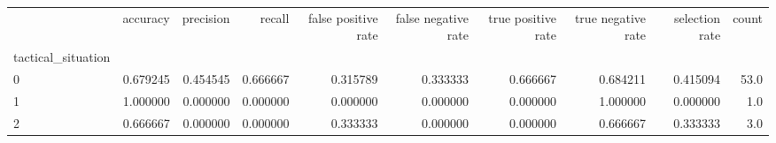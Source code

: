 \begin{tabular}{lrrrrrrrrr}
\toprule
{} &  accuracy &  precision &    recall &  false positive rate &  false negative rate &  true positive rate &  true negative rate &  selection rate &  count \\
tactical\_situation &           &            &           &                      &                      &                     &                     &                 &        \\
\midrule
0                  &  0.679245 &   0.454545 &  0.666667 &             0.315789 &             0.333333 &            0.666667 &            0.684211 &        0.415094 &   53.0 \\
1                  &  1.000000 &   0.000000 &  0.000000 &             0.000000 &             0.000000 &            0.000000 &            1.000000 &        0.000000 &    1.0 \\
2                  &  0.666667 &   0.000000 &  0.000000 &             0.333333 &             0.000000 &            0.000000 &            0.666667 &        0.333333 &    3.0 \\
\bottomrule
\end{tabular}
